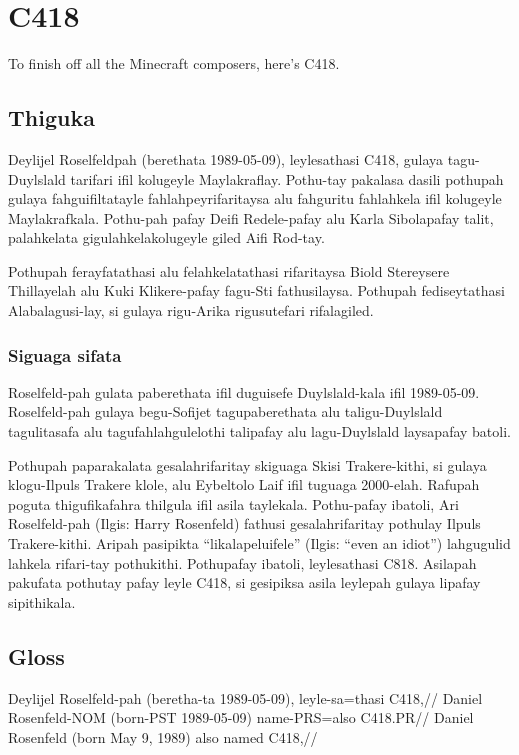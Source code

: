 

\chapter{C418}
To finish off all the Minecraft composers, here's C418.

\section{Thiguka}
Deylijel Roselfeldpah (berethata 1989-05-09), leylesathasi C418, gulaya tagu-Duylslald tarifari ifil kolugeyle Maylakraflay.
Pothu-tay pakalasa dasili pothupah gulaya fahguifiltatayle fahlahpeyrifaritaysa alu fahguritu fahlahkela ifil kolugeyle Maylakrafkala.
Pothu-pah pafay Deifi Redele-pafay alu Karla Sibolapafay talit, palahkelata gigulahkelakolugeyle giled Aifi Rod-tay.

Pothupah ferayfatathasi alu felahkelatathasi rifaritaysa Biold Stereysere Thillayelah alu Kuki Klikere-pafay fagu-Sti fathusilaysa.
Pothupah fediseytathasi Alabalagusi-lay, si gulaya rigu-Arika rigusutefari rifalagiled.

\subsection{Siguaga sifata}
Roselfeld-pah gulata paberethata ifil duguisefe Duylslald-kala ifil 1989-05-09.
Roselfeld-pah gulaya begu-Sofijet tagupaberethata alu taligu-Duylslald tagulitasafa alu tagufahlahgulelothi talipafay alu lagu-Duylslald laysapafay batoli.

Pothupah paparakalata gesalahrifaritay skiguaga Skisi Trakere-kithi, si gulaya klogu-Ilpuls Trakere klole, alu Eybeltolo Laif ifil tuguaga 2000-elah.
Rafupah poguta thigufikafahra thilgula ifil asila taylekala.
Pothu-pafay ibatoli, Ari Roselfeld-pah (Ilgis: Harry Rosenfeld) fathusi gesalahrifaritay pothulay Ilpuls Trakere-kithi.
Aripah pasipikta ``likalapeluifele'' (Ilgis: ``even an idiot'') lahgugulid lahkela rifari-tay pothukithi.
Pothupafay ibatoli, leylesathasi C818.
Asilapah pakufata pothutay pafay leyle C418, si gesipiksa asila leylepah gulaya lipafay sipithikala.

\newpage

\section{Gloss}

\ex
\begingl
          \gla  Deylijel Roselfeld-pah (beretha-ta 1989-05-09), leyle-sa=thasi C418,//
          \glb  Daniel Rosenfeld-NOM (born-PST 1989-05-09) name-PRS=also C418.PR//
          \glft Daniel Rosenfeld (born May 9, 1989) also named C418,//
\endgl
\xe


